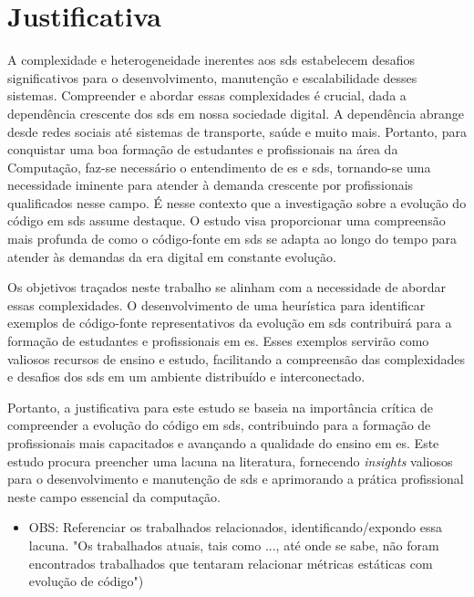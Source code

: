 \section{Justificativa}\label{sec:justificativa}
A complexidade e heterogeneidade inerentes aos \gls{sds} estabelecem desafios significativos para o desenvolvimento, manutenção e escalabilidade desses sistemas. Compreender e abordar essas complexidades é crucial, dada a dependência crescente dos \gls{sds} em nossa sociedade digital. A dependência abrange desde redes sociais até sistemas de transporte, saúde e muito mais. Portanto, para conquistar uma boa formação de estudantes e profissionais na área da Computação, faz-se necessário o entendimento de \gls{es} e \gls{sds}, tornando-se uma necessidade iminente para atender à demanda crescente por profissionais qualificados nesse campo.
É nesse contexto que a investigação sobre a evolução do código em \gls{sds} assume destaque. O estudo visa proporcionar uma compreensão mais profunda de como o código-fonte em \gls{sds} se adapta ao longo do tempo para atender às demandas da era digital em constante evolução.

Os objetivos traçados neste trabalho se alinham com a necessidade de abordar essas complexidades. O desenvolvimento de uma heurística para identificar exemplos de código-fonte representativos da evolução em \gls{sds} contribuirá para a formação de estudantes e profissionais em \gls{es}. Esses exemplos servirão como valiosos recursos de ensino e estudo, facilitando a compreensão das complexidades e desafios dos \gls{sds} em um ambiente distribuído e interconectado.

Portanto, a justificativa para este estudo se baseia na importância crítica de compreender a evolução do código em \gls{sds}, contribuindo para a formação de profissionais mais capacitados e avançando a qualidade do ensino em \gls{es}. Este estudo procura preencher uma lacuna na literatura, fornecendo \textit{insights} valiosos para o desenvolvimento e manutenção de \gls{sds} e aprimorando a prática profissional neste campo essencial da computação.

\begin{itemize}
    \item OBS: Referenciar os trabalhados relacionados, identificando/expondo essa lacuna. "Os trabalhados atuais, tais como ..., até onde se sabe, não foram encontrados trabalhados que tentaram relacionar métricas estáticas com evolução de código")
\end{itemize}


